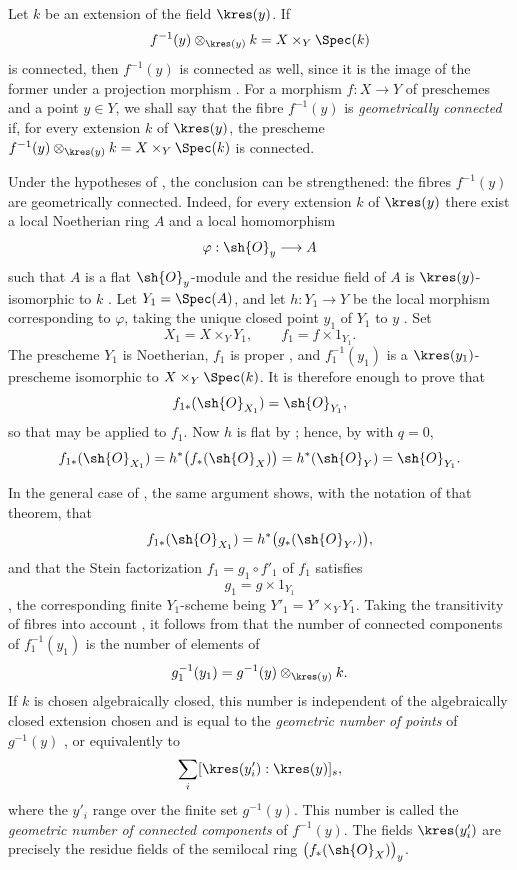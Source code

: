 \begin{remark}[4.3.4]
\label{III.4.3.4}
Let $k$ be an extension of the field $\kres(y)$.  If
\[
  f^{-1}(y)\otimes_{\kres(y)}k
  =
  X\times_Y\Spec(k)
\]
is connected, then $f^{-1}(y)$ is connected as well, since it is the
image of the former under a projection morphism
.  For a morphism $f:X\to Y$ of preschemes and a
point $y\in Y$, we shall say that the fibre $f^{-1}(y)$ is
\emph{geometrically connected} if, for every extension $k$ of
$\kres(y)$, the prescheme
$f^{-1}(y)\otimes_{\kres(y)}k=X\times_Y\Spec(k)$ is connected.


Under the hypotheses of , the conclusion can be
strengthened: the fibres $f^{-1}(y)$ are geometrically connected.
Indeed, for every extension $k$ of $\kres(y)$ there exist a local
Noetherian ring $A$ and a local homomorphism
\[
  \varphi:\sh{O}_y\longrightarrow A
\]
such that $A$ is a flat $\sh{O}_y$-module and the residue field of
$A$ is $\kres(y)$-isomorphic to $k$ .
Let $Y_1=\Spec(A)$, and let $h:Y_1\to Y$ be the local morphism
corresponding to $\varphi$, taking the unique closed point $y_1$ of
$Y_1$ to $y$ .  Set
\[
  X_1=X\times_Y Y_1,
  \qquad
  f_1=f\times 1_{Y_1}.
\]
The prescheme $Y_1$ is Noetherian, $f_1$ is proper
, and $f_1^{-1}(y_1)$ is a
$\kres(y_1)$-prescheme isomorphic to $X\times_Y\Spec(k)$.  It is
therefore enough to prove that
\[
  f_{1*}(\sh{O}_{X_1})=\sh{O}_{Y_1},
\]
so that  may be applied to $f_1$.  Now $h$ is flat
by ; hence, by  with $q=0$,
\[
  f_{1*}(\sh{O}_{X_1})
  =
  h^*\bigl(f_*(\sh{O}_X)\bigr)
  =
  h^*(\sh{O}_Y)
  =
  \sh{O}_{Y_1}.
\]

In the general case of , the same argument shows,
with the notation of that theorem, that
\[
  f_{1*}(\sh{O}_{X_1})
  =
  h^*\bigl(g_*(\sh{O}_{Y'})\bigr),
\]
and that the Stein factorization $f_1=g_1\circ f'_1$ of $f_1$
satisfies
\[
  g_1=g\times 1_{Y_1}
\]
, the corresponding finite $Y_1$-scheme being
$Y'_1=Y'\times_Y Y_1$.  Taking the transitivity of fibres into
account , it follows from
 that the number of connected components of
$f_1^{-1}(y_1)$ is the number of elements of
\[
  g_1^{-1}(y_1)
  =
  g^{-1}(y)\otimes_{\kres(y)}k.
\]
If $k$ is chosen algebraically closed, this number is independent of
the algebraically closed extension chosen and is equal to the
\emph{geometric number of points} of $g^{-1}(y)$
, or equivalently to
\[
  \sum_i[\kres(y'_i):\kres(y)]_s,
\]
where the $y'_i$ range over the finite set $g^{-1}(y)$.  This number
is called the \emph{geometric number of connected components} of
$f^{-1}(y)$.  The fields $\kres(y'_i)$ are precisely the residue
fields of the semilocal ring $\bigl(f_*(\sh{O}_X)\bigr)_y$.
\end{remark}

